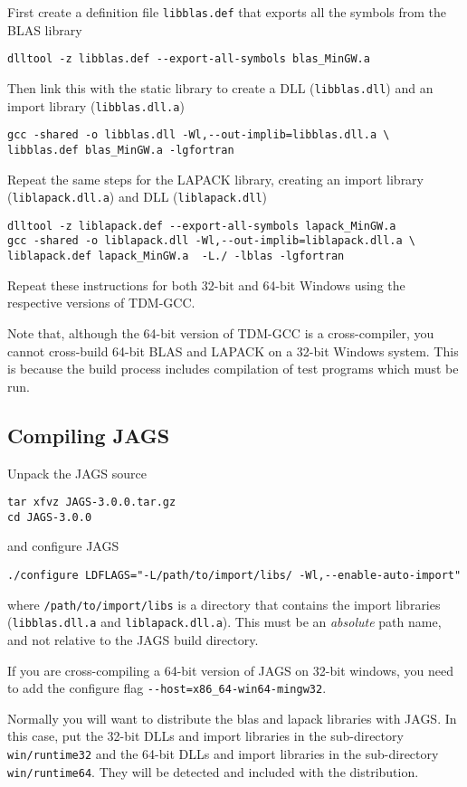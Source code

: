 \documentclass[11pt, a4paper, titlepage]{article}
\newcommand{\JAGS}{\textsf{JAGS}}
\begin{document}
First create a definition file \verb+libblas.def+ that exports all the
symbols from the BLAS library
\begin{verbatim}
dlltool -z libblas.def --export-all-symbols blas_MinGW.a
\end{verbatim}
Then link this with the static library to create a DLL
(\verb+libblas.dll+) and an import library (\verb+libblas.dll.a+)
\begin{verbatim}
gcc -shared -o libblas.dll -Wl,--out-implib=libblas.dll.a \
libblas.def blas_MinGW.a -lgfortran
\end{verbatim}
 
Repeat the same steps for the LAPACK library, creating an import library
(\verb+liblapack.dll.a+) and DLL (\verb+liblapack.dll+)
\begin{verbatim}
dlltool -z liblapack.def --export-all-symbols lapack_MinGW.a
gcc -shared -o liblapack.dll -Wl,--out-implib=liblapack.dll.a \
liblapack.def lapack_MinGW.a  -L./ -lblas -lgfortran
\end{verbatim}

Repeat these instructions for both 32-bit and 64-bit Windows using the
respective versions of TDM-GCC.

Note that, although the 64-bit version of TDM-GCC is a cross-compiler,
you cannot cross-build 64-bit BLAS and LAPACK on a 32-bit Windows
system. This is because the build process includes compilation of test
programs which must be run.

\subsection{Compiling \JAGS}

Unpack the JAGS source
\begin{verbatim}
tar xfvz JAGS-3.0.0.tar.gz
cd JAGS-3.0.0
\end{verbatim}
and configure JAGS
\begin{verbatim}
./configure LDFLAGS="-L/path/to/import/libs/ -Wl,--enable-auto-import" 
\end{verbatim}
where \verb+/path/to/import/libs+ is a directory that contains the
import libraries (\verb+libblas.dll.a+ and \verb+liblapack.dll.a+).
This must be an {\em absolute} path name, and not relative to
the JAGS build directory.

If you are cross-compiling a 64-bit version of JAGS on 32-bit windows,
you need to add the configure flag \verb+--host=x86_64-win64-mingw32+.

Normally you will want to distribute the blas and lapack libraries
with JAGS.  In this case, put the 32-bit DLLs and import libraries in
the sub-directory \verb+win/runtime32+ and the 64-bit DLLs and import
libraries in the sub-directory \verb+win/runtime64+. They will be
detected and included with the distribution.
\end{document}
